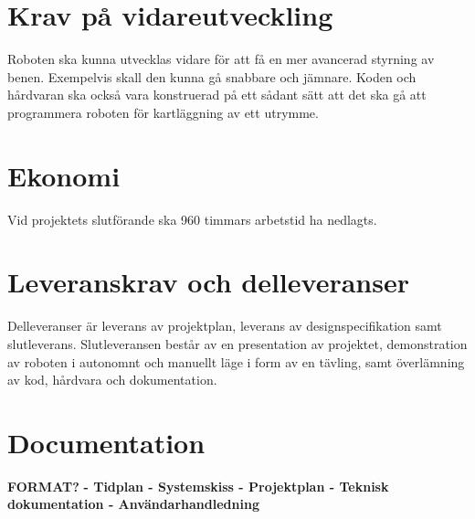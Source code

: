 \documentclass[a4paper,titlepage,12pt]{article}
\begin{document}

	\section{Krav på vidareutveckling}
	Roboten ska kunna utvecklas vidare för att få en mer avancerad styrning av benen. 
	Exempelvis skall den kunna gå snabbare och jämnare. Koden och hårdvaran ska också vara
	konstruerad på ett sådant sätt att det ska gå att programmera roboten för
	kartläggning av ett utrymme.

	\section{Ekonomi}
	Vid projektets slutförande ska 960 timmars arbetstid ha nedlagts.

	\section{Leveranskrav och delleveranser}
	Delleveranser är leverans av projektplan, leverans av designspecifikation 
	samt slutleverans. Slutleveransen består av en presentation av projektet, 
	demonstration av roboten i autonomnt och manuellt läge i form av en tävling,
	samt överlämning av kod, hårdvara och dokumentation.
	
	\section{Documentation}
	\textbf{FORMAT?}
	\textbf{
		- Tidplan 
		- Systemskiss 
		- Projektplan
		- Teknisk dokumentation 
		- Användarhandledning 
	}
\end{document}
